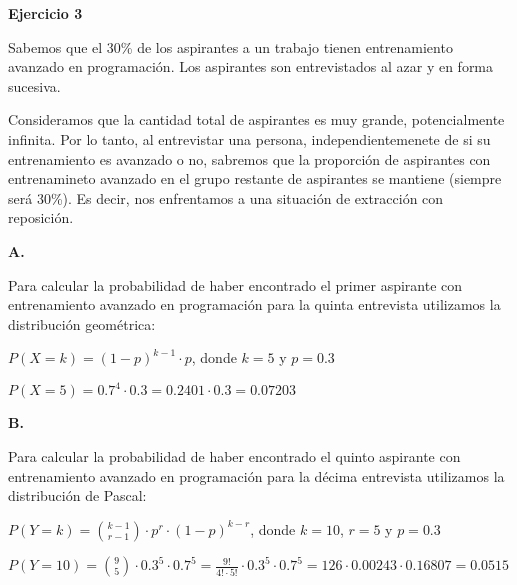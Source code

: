 \documentclass[11pt]{article}
\begin{document}
\textbf{Ejercicio 3}

Sabemos que el 30\% de los aspirantes a un trabajo tienen entrenamiento avanzado en programación. Los aspirantes son entrevistados al azar y en forma sucesiva. \par
Consideramos que la cantidad total de aspirantes es muy grande, potencialmente infinita. Por lo tanto, al entrevistar una persona, independientemenete de si su entrenamiento es avanzado o no, sabremos que la proporción de aspirantes con entrenamineto avanzado en el grupo restante de aspirantes se mantiene (siempre será 30\%). Es decir, nos enfrentamos a una situación de extracción con reposición. \par

\textbf{A.} \par
Para calcular la probabilidad de haber encontrado el primer aspirante con entrenamiento avanzado en programación para la quinta entrevista utilizamos la distribución geométrica: \par
$P(X=k) = (1-p)^{k-1} \cdot p$, donde $k = 5$ y $p = 0.3$ \par
$P(X=5) = 0.7^4 \cdot 0.3 = 0.2401 \cdot 0.3 = 0.07203 $


\textbf{B.} \par
Para calcular la probabilidad de haber encontrado el quinto aspirante con entrenamiento avanzado en programación para la décima entrevista utilizamos la distribución de Pascal: \par
$P(Y=k) = \binom{k-1}{r-1} \cdot p^r \cdot (1-p)^{k-r}$, donde $k = 10$, $r = 5$ y $p = 0.3$ \par
$P(Y=10) = \binom{9}{5} \cdot 0.3^5 \cdot 0.7^5 = \frac{9!}{4! \cdot 5!} \cdot 0.3^5 \cdot 0.7^5 = 126 \cdot 0.00243 \cdot 0.16807 = 0.0515$
\end{document}
